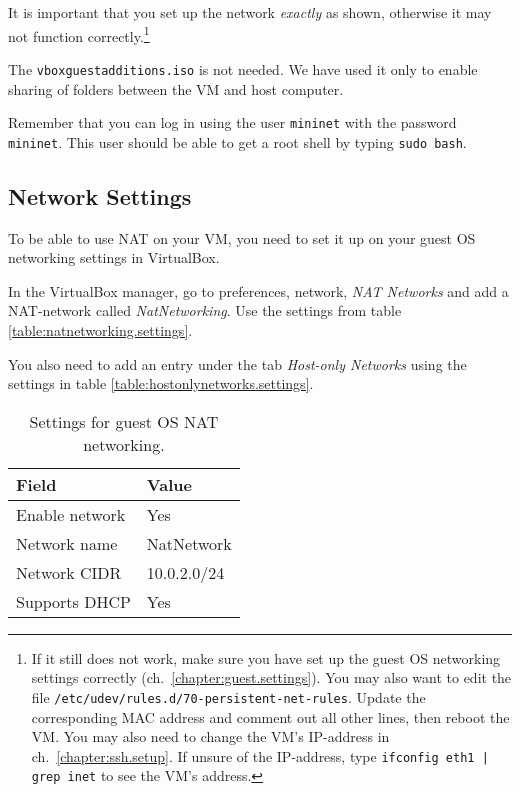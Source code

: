 It is important that you set up the network
\textit{exactly} as shown, otherwise it may not function correctly.\footnote{
  If it still does not work, make sure you have set up the guest OS
    networking settings correctly (ch.~\vref{chapter:guest.settings}).
  You may also want to edit the file
  \texttt{/etc/udev/rules.d/70-persistent-net-rules}.
  Update the corresponding MAC address and comment out all other lines, then
  reboot the VM.
   You may also need to change the VM's IP-address in
  ch.~\vref{chapter:ssh.setup}. If unsure of the IP-address, type
  \texttt{ifconfig eth1 | grep inet} to see the VM's address.
}

The \texttt{vboxguestadditions.iso} is not needed. We have used it only to
enable sharing of folders between the VM and host computer.

Remember that you can log in using the user \texttt{mininet} with the
password \texttt{mininet}.  This user should be able to get a root shell by
typing \texttt{sudo bash}.

\subsection{Network Settings}
\label{chapter:guest.settings}

To be able to use \ac{NAT} on your VM, you need to set it up on your guest
OS networking settings in VirtualBox.

In the VirtualBox manager, go to preferences, network, \textit{NAT Networks}
and add a \acs{NAT}-network called \textit{NatNetworking}. Use the settings
from table \vref{table:natnetworking.settings}.

You also need to add an entry under the tab \textit{Host-only Networks}
using the settings in table
\vref{table:hostonlynetworks.settings}.

\begin{table}[H]
  \centering
  \begin{tabular}{ll}
    \hline \textbf{Field} & \textbf{Value} \\
    \hline
      Enable network & Yes \\
      Network name & NatNetwork \\
      Network CIDR & 10.0.2.0/24 \\
      Supports DHCP & Yes \\
    \hline
  \end{tabular}
  \caption{Settings for guest OS NAT networking.}
  \label{table:natnetworking.settings}
\end{table}

